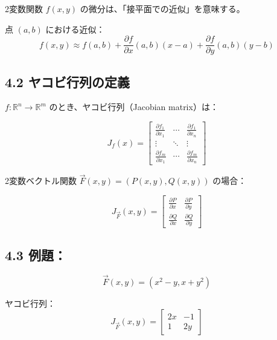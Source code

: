 \documentclass[a4j,11pt]{jsarticle}
\begin{document}
2変数関数 $f(x, y)$ の微分は、「接平面での近似」を意味する。

点 $(a, b)$ における近似：
\[
f(x, y) \approx f(a, b) + \frac{\partial f}{\partial x}(a, b)(x - a) + \frac{\partial f}{\partial y}(a, b)(y - b)
\]

\subsection*{4.2 ヤコビ行列の定義}

$f: \mathbb{R}^n \to \mathbb{R}^m$ のとき、ヤコビ行列（Jacobian matrix）は：

\[
J_f(x) = 
\begin{bmatrix}
\displaystyle \frac{\partial f_1}{\partial x_1} & \cdots & \displaystyle \frac{\partial f_1}{\partial x_n} \\
\vdots & \ddots & \vdots \\
\displaystyle \frac{\partial f_m}{\partial x_1} & \cdots & \displaystyle \frac{\partial f_m}{\partial x_n}
\end{bmatrix}
\]

2変数ベクトル関数 $\vec{F}(x, y) = (P(x, y), Q(x, y))$ の場合：

\[
J_{\vec{F}}(x, y) = 
\begin{bmatrix}
\displaystyle \frac{\partial P}{\partial x} & \displaystyle \frac{\partial P}{\partial y} \\
\displaystyle \frac{\partial Q}{\partial x} & \displaystyle \frac{\partial Q}{\partial y}
\end{bmatrix}
\]

\subsection*{4.3 例題：}
\[
\vec{F}(x, y) = (x^2 - y, x + y^2)
\]

ヤコビ行列：
\[
J_{\vec{F}}(x, y) =
\begin{bmatrix}
2x & -1 \\
1 & 2y
\end{bmatrix}
\]
\end{document}
